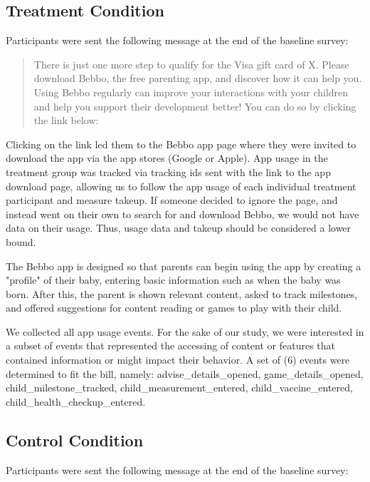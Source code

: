 \documentclass{article}
\begin{document}
\subsection*{Treatment Condition}

Participants were sent the following message at the end of the baseline survey:

\begin{quote}
There is just one more step to qualify for the Visa gift card of X. Please download Bebbo, the free parenting app, and discover how it can help you. Using Bebbo regularly can improve your interactions with your children and help you support their development better! You can do so by clicking the link below:
\end{quote}

Clicking on the link led them to the Bebbo app page where they were invited to download the app via the app stores (Google or Apple). App usage in the treatment group was tracked via tracking ids sent with the link to the app download page, allowing us to follow the app usage of each individual treatment participant and measure takeup. If someone decided to ignore the page, and instead went on their own to search for and download Bebbo, we would not have data on their usage. Thus, usage data and takeup should be considered a lower bound.

The Bebbo app is designed so that parents can begin using the app by creating a "profile" of their baby, entering basic information such as when the baby was born. After this, the parent is shown relevant content, asked to track milestones, and offered suggestions for content reading or games to play with their child.

We collected all app usage events. For the sake of our study, we were interested in a subset of events that represented the accessing of content or features that contained information or might impact their behavior. A set of (6) events were determined to fit the bill, namely: advise\_details\_opened, game\_details\_opened, child\_milestone\_tracked, child\_measurement\_entered, child\_vaccine\_entered, child\_health\_checkup\_entered.


\subsection*{Control Condition}

Participants were sent the following message at the end of the baseline survey:
\end{document}
